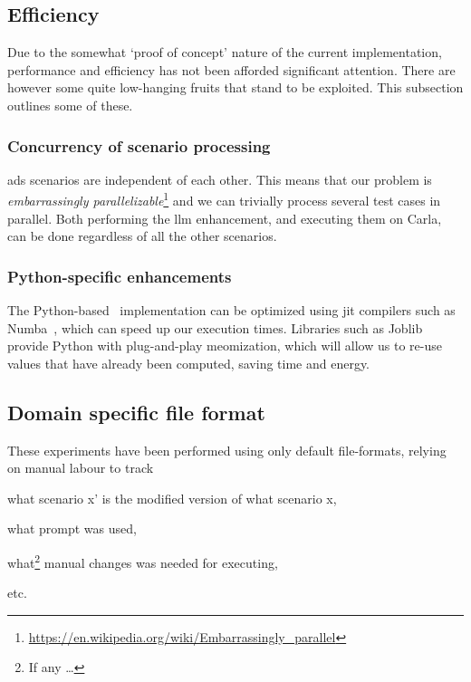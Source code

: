 \subsection{Efficiency}

Due to the somewhat `proof of concept' nature of the current \hefe{}
implementation, performance and efficiency has not been afforded significant
attention. There are however some quite low-hanging fruits that stand to be
exploited. This subsection outlines some of these.

\subsubsection{Concurrency of scenario processing}

\acrshort{ads} scenarios are independent of each other. This means that our problem is
\textit{embarrassingly
    parallelizable}\footnote{\url{https://en.wikipedia.org/wiki/Embarrassingly_parallel}}
and we can trivially process several test cases in parallel. Both performing the
\acrshort{llm} enhancement, and executing them on Carla, can be done regardless
of all the other scenarios.

\subsubsection{Python-specific enhancements}

The Python-based \hefe~implementation can be optimized using \acrfull{jit}
compilers such as Numba~\cite{numba}, which can speed up our execution times.
Libraries such as Joblib provide Python with plug-and-play meomization, which
will allow us to re-use values that have already been computed, saving time and
energy.


\subsection{Domain specific file format}

These experiments have been performed using only default file-formats, relying on manual labour to
track \begin{inparaenum}
    \item what scenario x' is the modified version of what scenario x,
    \item what prompt was used,
    \item what\footnote{If any \ldots} manual changes was needed for executing,
\end{inparaenum} etc.

